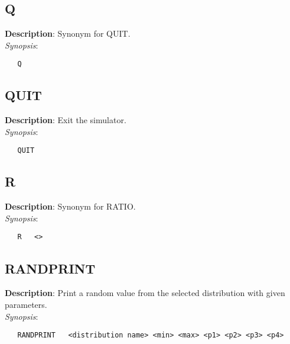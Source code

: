 \subsection{\bf Q}
\label{manpages:Q}
\label{manpages:q}
\vspace{-0.2in}
{\bf Description}: 	Synonym for QUIT.\\[1.5ex]
{\em Synopsis}:
\vspace{-0.2in}
\scriptsize
\begin{verbatim}
   Q   							
\end{verbatim}
\normalsize
\vspace{-0.2in}


\subsection{\bf QUIT}
\label{manpages:QUIT}
\label{manpages:quit}
\vspace{-0.2in}
{\bf Description}: 	Exit the simulator.\\[1.5ex]
{\em Synopsis}:
\vspace{-0.2in}
\scriptsize
\begin{verbatim}
   QUIT   						
\end{verbatim}
\normalsize
\vspace{-0.2in}


\subsection{\bf R}
\label{manpages:R}
\label{manpages:r}
\vspace{-0.2in}
{\bf Description}: 	Synonym for RATIO.\\[1.5ex]
{\em Synopsis}:
\vspace{-0.2in}
\scriptsize
\begin{verbatim}
   R   <>						
\end{verbatim}
\normalsize
\vspace{-0.2in}


\subsection{\bf RANDPRINT}
\label{manpages:RANDPRINT}
\label{manpages:randprint}
\vspace{-0.2in}
{\bf Description}: 	Print a random value from the selected distribution with given parameters.\\[1.5ex]
{\em Synopsis}:
\vspace{-0.2in}
\scriptsize
\begin{verbatim}
   RANDPRINT   <distribution name> <min> <max> <p1> <p2> <p3> <p4> 
\end{verbatim}
\normalsize
\vspace{-0.2in}


